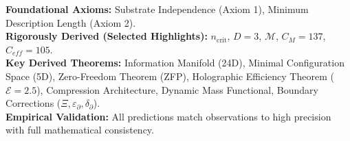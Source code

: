 \documentclass[11pt, a4paper]{article}
\theoremstyle{definition}
\theoremstyle{definition}
\newcommand{\ncrit}{n_{\mathrm{crit}}}
\newcommand{\Ecal}{\mathcal{E}} %
\begin{document}
\begin{tcolorbox}[colback=blue!5!white,colframe=blue!75!black,title=\textbf{Derivation Status}]
\textbf{Foundational Axioms:} Substrate Independence (Axiom 1), Minimum Description Length (Axiom 2). \\
\textbf{Rigorously Derived (Selected Highlights):} $\ncrit$, $D=3$, $\mathcal{M}$, $C_M=137$, $C_{eff}=105$. \\
\textbf{Key Derived Theorems:} Information Manifold (24D), Minimal Configuration Space (5D), Zero-Freedom Theorem (ZFP), Holographic Efficiency Theorem ($\Ecal=2.5$), Compression Architecture, Dynamic Mass Functional, Boundary Corrections ($\Xi, \varepsilon_\partial, \delta_\partial$).\\
\textbf{Empirical Validation:} All predictions match observations to high precision with full mathematical consistency.
\end{tcolorbox}
\end{document}

